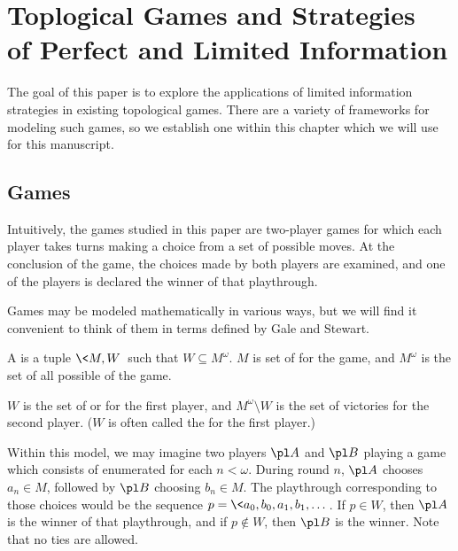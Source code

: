 
\chapter{Toplogical Games and Strategies\\ of Perfect and Limited Information}

The goal of this paper is to explore the applications of limited information
strategies in existing topological games. There are a variety of frameworks
for modeling such games, so we establish one within this chapter which we
will use for this manuscript.

\section{Games}

Intuitively, the games studied in this paper are two-player games for which
each player takes turns making a choice from a set of possible moves. At
the conclusion of the game, the choices made by both players are examined,
and one of the players is declared the winner of that playthrough.

Games may be modeled mathematically in various ways,
but we will find it convenient to think of them in terms defined by
Gale and Stewart. \cite{MR0054922}

\begin{defn}
  A  is a tuple $\<M,W\>$ such that
  $W\subseteq M^{\omega}$. $M$ is set of  for
  the game, and $M^{\omega}$ is the set of all possible
   of the game.

  $W$ is the set of  or  for the
  first player, and $M^{\omega}\setminus W$ is the set of victories for the
  second player. ($W$ is often called the  for the
  first player.)
\end{defn}

Within this model, we may imagine two players $\pl A$ and $\pl B$ playing a
game which consists of  enumerated for each $n<\omega$.
During round $n$, $\pl A$ chooses $a_n\in M$, followed by $\pl B$ choosing
$b_n\in M$. The playthrough corresponding to those choices would be
the sequence $p = \<a_0,b_0,a_1,b_1,\dots\>$. If $p\in W$, then $\pl A$
is the winner of that playthrough, and if $p\not\in W$, then $\pl B$ is
the winner. Note that no ties are allowed.

